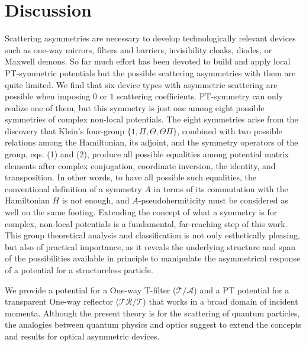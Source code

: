 \section{Discussion}
%
%
Scattering asymmetries are necessary to develop technologically relevant devices such
as one-way mirrors, filters and  barriers, invisibility cloaks, diodes, or Maxwell demons.
So far much effort has been devoted to build and apply local PT-symmetric potentials but the possible scattering asymmetries with them are
quite limited. We find that six  device types with asymmetric scattering are possible
when imposing $0$ or $1$ scattering coefficients.
PT-symmetry can only realize one of them, but this symmetry  is just one among eight possible symmetries of complex non-local potentials.
The eight symmetries arise from the discovery that Klein's four-group
$\{1, \Pi, \Theta, \Theta\Pi\}$, combined with two possible relations among the Hamiltonian, its adjoint,
and the symmetry operators of the group, eqs. (1) and (2),
produce all possible  equalities among potential matrix elements after complex conjugation, coordinate inversion, the identity, and transposition.
In other words, to have all possible such equalities, the conventional definition of a symmetry $A$ in terms of its commutation with the Hamiltonian $H$ is not enough, and $A$-pseudohermiticity must be considered as well on the same footing.
Extending the concept of what a symmetry is for complex, non-local potentials is
a fundamental, far-reaching step of this work.
This group theoretical analysis and classification is not only esthetically pleasing, but also of practical importance, as it reveals
the underlying structure and span of the possibilities available in principle to manipulate the asymmetrical response of a potential
for a structureless particle.

We provide a potential for a One-way T-filter ($\mathcal{T}/\mathcal{A}$) and a PT potential for a transparent One-way reflector ($\mathcal{T}\mathcal{R}/\mathcal{T}$) that works in a broad domain of incident momenta. Although the present theory is for the scattering of quantum particles, the analogies between quantum physics and optics suggest to extend the concepts and results for optical asymmetric devices.
%
